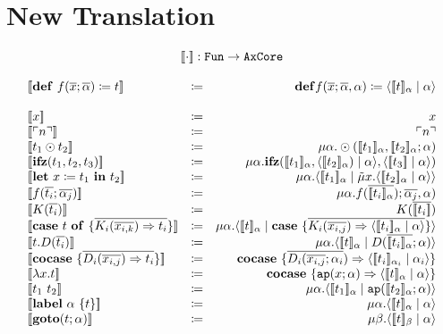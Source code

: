\documentclass{article}
\newcommand{\translate}[1]{\ensuremath{[\![#1]\!]}}
\newcommand{\lit}[1]{\ensuremath{\ulcorner #1\urcorner}}
\newcommand{\cut}[2]{\ensuremath{\langle #1 \mid #2 \rangle}}
\newcommand{\letin}[3]{\ensuremath{\mathbf{let}\ #1 \coloneq #2\ \mathbf{in}\ #3}}
\newcommand{\caseof}[2]{\ensuremath{\mathbf{case}\ #1\ \mathbf{of}\ \{ #2 \}}}
\begin{document}
\section{New Translation}
\[
  \begin{array}{l c r}
    \multicolumn{3}{c}{\translate{\cdot} : \mathtt{Fun}\rightarrow\mathtt{AxCore}}\\
    \\
    \translate{\mathbf{def}\ f(\overline{x};\overline{\alpha}) \coloneq t} & \coloneq & \mathbf{def}f(\overline{x};\overline{\alpha},\alpha) \coloneq \cut{\translate{t}_{\alpha}}{\alpha}\\
    \\
    \translate{x} & \coloneq  & x \\
    \translate{\lit{n}} & \coloneq & \lit{n}\\
    \translate{t_1 \odot t_2} & \coloneq & \mu \alpha. \odot(\translate{t_1}_{\alpha},\translate{t_2}_{\alpha};\alpha)\\
    \translate{\mathbf{ifz}(t_1,t_2,t_3)} & \coloneq & \mu\alpha.\mathbf{ifz}(\translate{t_1}_{\alpha},\cut{\translate{t_2}_{\alpha})}{\alpha},\cut{\translate{t_3}}{\alpha})\\
    \translate{\letin{x}{t_1}{t_2}} & \coloneq & \mu\alpha.\cut{\translate{t_1}_{\alpha}}{\tilde{\mu}x.\cut{\translate{t_2}_{\alpha}}{\alpha}}\\
    \translate{f(\overline{t_i};\overline{\alpha_j})} & \coloneq & \mu\alpha.f(\overline{\translate{t_i}_{\alpha}});\overline{\alpha_j},\alpha)\\
    \translate{K(\overline{t_i})} & \coloneq & K(\overline{\translate{t_i}})\\
    \translate{\caseof{t}{\overline{K_i(\overline{x_{i,k}}) \Rightarrow t_i}}} & \coloneq & \mu\alpha.\cut{\translate{t}_{\alpha}}{\mathbf{case}\ \{\overline{K_i(\overline{x_{i,j}})\Rightarrow \cut{\translate{t_i}_{\alpha}}{\alpha}} \}}\\
    \translate{t.D(\overline{t_i})} & \coloneq & \mu\alpha.\cut{\translate{t}_{\alpha}}{D(\overline{\translate{t_i}_{\alpha}};\alpha)}\\
    \translate{\mathbf{cocase}\ \{\overline{D_i(\overline{x_{i,j}})\Rightarrow t_i}\}} & \coloneq & \mathbf{cocase}\ \{ \overline{D_i(\overline{x_{i,j}};\alpha_i})\Rightarrow \cut{\translate{t_i}_{\alpha_i}}{\alpha_i} \}\\
    \translate{\lambda x.t} & \coloneq & \mathbf{cocase}\ \{\mathtt{ap}(x;\alpha) \Rightarrow \cut{\translate{t}_{\alpha}}{\alpha}\}\\
    \translate{t_1\ t_2} & \coloneq & \mu\alpha.\cut{\translate{t_1}_{\alpha}}{\mathtt{ap}(\translate{t_2}_{\alpha};\alpha)}\\
    \translate{\mathbf{label}\ \alpha\ \{t\}} & \coloneq & \mu\alpha.\cut{\translate{t}_{\alpha}}{\alpha}\\
    \translate{\mathbf{goto}(t;\alpha)} & \coloneq & \mu\beta.\cut{\translate{t}_{\beta}}{\alpha}\\
  \end{array}
\]
\end{document}
